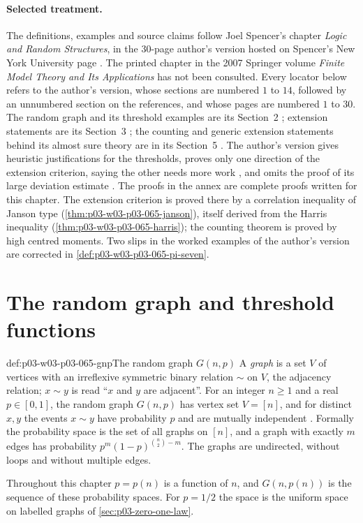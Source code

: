 \paragraph{Selected treatment.}
The definitions, examples and source claims follow Joel Spencer's chapter
\emph{Logic and Random Structures}, in the 30-page author's version hosted on
Spencer's New York University page
\cite{Spencer2007LogicRandomStructuresAuthor}.  The printed chapter in the
2007 Springer volume \emph{Finite Model Theory and Its Applications} has not
been consulted.  Every locator below refers to the author's version, whose
sections are numbered \(1\) to \(14\), followed by an unnumbered section on
the references, and whose pages are numbered \(1\) to \(30\).  The random
graph and its threshold examples are its Section~2
\cite[pp.~4--6]{Spencer2007LogicRandomStructuresAuthor}; extension statements
are its Section~3 \cite[pp.~6--8]{Spencer2007LogicRandomStructuresAuthor};
the counting and generic extension statements behind its almost sure theory
are in its Section~5 \cite[pp.~9--11]{Spencer2007LogicRandomStructuresAuthor}.
The author's version gives heuristic justifications for the thresholds,
proves only one direction of the extension criterion, saying the other needs
more work \cite[p.~7]{Spencer2007LogicRandomStructuresAuthor}, and omits the
proof of its large deviation estimate
\cite[pp.~10--11]{Spencer2007LogicRandomStructuresAuthor}.  The proofs in the
annex are complete proofs written for this chapter.  The extension criterion
is proved there by a correlation inequality of Janson type
(\cref{thm:p03-w03-p03-065-janson}), itself derived from the Harris
inequality (\cref{thm:p03-w03-p03-065-harris}); the counting theorem is
proved by high centred moments.  Two slips in the worked examples of the
author's version are corrected in \cref{def:p03-w03-p03-065-pi-seven}.

\section{The random graph and threshold functions}
\label{sec:p03-w03-p03-065-thresholds}

\begin{hbdefinition}{def:p03-w03-p03-065-gnp}{The random graph \(G(n,p)\)}
A \emph{graph} is a set \(V\) of vertices with an irreflexive symmetric
binary relation \(\sim\) on \(V\), the adjacency relation; \(x\sim y\) is read
``\(x\) and \(y\) are adjacent''.  For an integer \(n\geq1\) and a real
\(p\in[0,1]\), the random graph \(G(n,p)\) has vertex set \(V=[n]\), and for
distinct \(x,y\) the events \(x\sim y\) have probability \(p\) and are
mutually independent \cite[p.~4]{Spencer2007LogicRandomStructuresAuthor}.  Formally the
probability space is the set of all graphs on \([n]\), and a graph with
exactly \(m\) edges has probability \(p^m(1-p)^{\binom n2-m}\).  The graphs
are undirected, without loops and without multiple edges.

Throughout this chapter \(p=p(n)\) is a function of \(n\), and \(G(n,p(n))\)
is the sequence of these probability spaces.  For \(p=1/2\) the space is the
uniform space on labelled graphs of \cref{sec:p03-zero-one-law}.
\end{hbdefinition}

